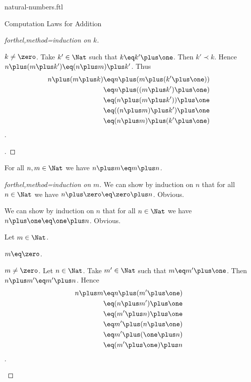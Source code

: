 \documentclass{naproche-library}
\begin{document}
\begin{smodule}[title=Natural Numbers]{natural-numbers.ftl}
\begin{sfragment}{Computation Laws for Addition}
\begin{proof}[forthel,method=induction on $k$]
    \begin{case}{$k\neq\zero$.}
      Take $k'\in\Nat$ such that $k\eq k'\plus\one$.
      Then $k'\prec k$.
      Hence $n\plus(m\plus k')\eq(n\plus m)\plus k'$.
      Thus
      \begin{align*}
        n\plus(m\plus k)
          &\eq n\plus(m\plus(k'\plus\one))\\
          &\eq n\plus((m\plus k')\plus\one)\\
          &\eq (n\plus(m\plus k'))\plus\one\\
          &\eq ((n\plus m)\plus k')\plus\one\\
          &\eq (n\plus m)\plus(k'\plus\one)
      \end{align*}.
    \end{case}.
  \end{proof}

  \begin{proposition}[forthel,title=Commutativity,id=PlusIsCommutativeProp]
    For all $n,m\in\Nat$ we have $n\plus m\eq m\plus n$.
  \end{proposition}
  \begin{proof}[forthel,method=induction on $m$]
    We can show by induction on $n$ that for all $n\in\Nat$ we have $n\plus\zero\eq\zero\plus n$.
    Obvious.

    We can show by induction on $n$ that for all $n\in\Nat$ we have $n\plus\one\eq\one\plus n$.
    Obvious.

    Let $m\in\Nat$.

    \begin{case}{$m\eq\zero$.}\end{case}

    \begin{case}{$m\neq\zero$.}
      Let $n\in\Nat$.
      Take $m'\in\Nat$ such that $m\eq m'\plus\one$.
      Then $n\plus m'\eq m'\plus n$.
      Hence
      \begin{align*}
        n\plus m
          &\eq n\plus(m'\plus\one)\\
          &\eq (n\plus m')\plus\one\\
          &\eq (m'\plus n)\plus\one\\
          &\eq m'\plus(n\plus\one)\\
          &\eq m'\plus(\one\plus n)\\
          &\eq (m'\plus\one)\plus n
      \end{align*}.
    \end{case}
  \end{proof}


\end{sfragment}
\end{smodule}
\end{document}
